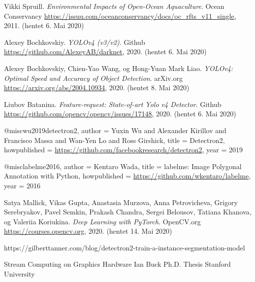 \documentclass[11ot]{article}
\begin{document}
\begin{thebibliography}{9}
Vikki Spruill.
\textit{Environmental Impacts of Open-Ocean Aquaculture}. 
Ocean Conservancy \url{https://issuu.com/oceanconservancy/docs/oc_rfts_v11_single}, 2011. (hentet 6. Mai 2020)

Alexey Bochkovskiy.
\textit{YOLOv4 (v3/v2)}. 
Github \url{https://github.com/AlexeyAB/darknet}, 2020. (hentet 6. Mai 2020)

Alexey Bochkovskiy, Chien-Yao Wang, og Hong-Yuan Mark Liao.
\textit{YOLOv4: Optimal Speed and Accuracy of Object Detection}. 
arXiv.org \url{https://arxiv.org/abs/2004.10934}, 2020. (hentet 8. Mai 2020)

Liubov Batanina.
\textit{Feature-request: State-of-art Yolo v4 Detector}. 
Github \url{https://github.com/opencv/opencv/issues/17148}, 2020. (hentet 6. Mai 2020)

@misc{wu2019detectron2,
  author =       {Yuxin Wu and Alexander Kirillov and Francisco Massa and
                  Wan-Yen Lo and Ross Girshick},
  title =        {Detectron2},
  howpublished = {\url{https://github.com/facebookresearch/detectron2}},
  year =         {2019}
}

@misc{labelme2016,
  author =       {Kentaro Wada},
  title =        {{labelme: Image Polygonal Annotation with Python}},
  howpublished = {\url{https://github.com/wkentaro/labelme}},
  year =         {2016}
}

Satya Mallick, Vikas Gupta, Anastasia Murzova, Anna Petrovicheva, Grigory Serebryakov, Pavel Semkin, Prakash Chandra, Sergei Belousov, Tatiana Khanova, og Valeriia Koriukina.
\textit{Deep Learning with PyTorch}. 
OpenCV.org \url{https://courses.opencv.org}, 2020. (hentet 14. Mai 2020)

https://gilberttanner.com/blog/detectron2-train-a-instance-segmentation-model

Stream Computing on Graphics Hardware
Ian Buck
Ph.D. Thesis
Stanford University

\end{thebibliography}




\end{document}
